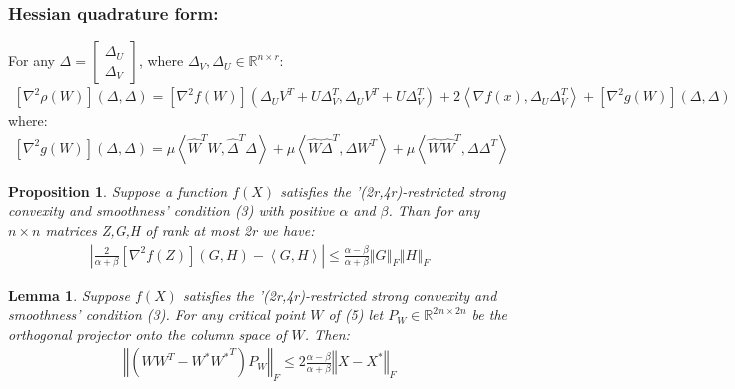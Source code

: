 \documentclass{article}
\newtheorem{lemma}[theorem]{Lemma}
\newtheorem{proposition}{Proposition}
\begin{document}
\subsubsection{Hessian quadrature form:}
For any $\Delta=\left[\begin{array}{c}
\Delta_{U}\\
\Delta_{V}
\end{array}\right]$, where $\Delta_{V},\Delta_{U}\in \mathbb{R}^{n\times r}$:
\begin{align*}
    \left[\nabla^2\rho\left(W\right)\right]\left(\Delta,\Delta\right)=\left[\nabla^2 f\left(W\right)\right]\left(\Delta_UV^T+U\Delta_V^T,\Delta_UV^T+U\Delta_V^T\right) + 2\left<\nabla f\left(x\right),\Delta_U\Delta_V^T\right> + \left[\nabla^2g\left(W\right)\right]\left(\Delta,\Delta\right)
\end{align*}
where:
\begin{align*}
    \left[\nabla^2g\left(W\right)\right]\left(\Delta,\Delta\right)=\mu\left<\hat{W}^TW,\hat{\Delta}^T\Delta\right>+\mu\left<\hat{W}\hat{\Delta}^T,\Delta W^T\right> + \mu\left<\hat{W}\hat{W}^T,\Delta \Delta^T\right>
\end{align*}

\begin{proposition} \label{proposition_2}
Suppose a function $f\left(X\right)$ satisfies the '(2r,4r)-restricted strong convexity and smoothness' condition (3) with positive $\alpha$ and $\beta$. Than for any $n\times n$ matrices Z,G,H of rank at most 2r we have:
\begin{align*}
    \left\vert\frac{2}{\alpha + \beta}\left[\nabla^2 f\left(Z\right)\right]\left(G,H\right)-\left<G,H\right>\right\vert\le \frac{\alpha - \beta}{\alpha + \beta}\left\Vert G\right\Vert_F\left\Vert H\right\Vert_F
\end{align*}
\end{proposition}

\begin{lemma} \label{lemma_2}
Suppose $f\left(X\right)$ satisfies the '(2r,4r)-restricted strong convexity and smoothness' condition (3). For any critical point $W$ of (5) let $P_W\in\mathbb{R}^{2n\times2n}$ be the orthogonal projector onto the column space of $W$. Then:
\begin{align*}
    \left\Vert \left(WW^T-W^*{W^*}^T\right)P_W\right\Vert_F\le2\frac{\alpha - \beta}{\alpha + \beta}\left\Vert X-X^*\right\Vert_F
\end{align*}
\end{lemma}
\end{document}
